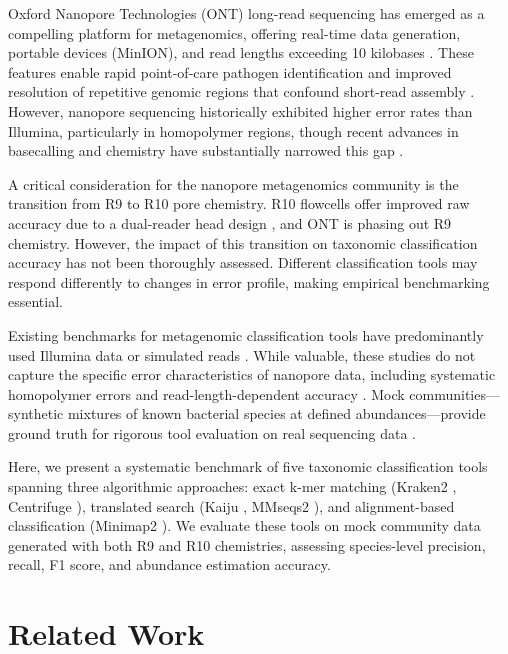 \documentclass[11pt]{article}
\begin{document}
Oxford Nanopore Technologies (ONT) long-read sequencing has emerged as a compelling platform for metagenomics, offering real-time data generation, portable devices (MinION), and read lengths exceeding 10 kilobases \citep{jain2016,loose2019}. These features enable rapid point-of-care pathogen identification and improved resolution of repetitive genomic regions that confound short-read assembly \citep{sanderson2023,samarakoon2020}. However, nanopore sequencing historically exhibited higher error rates than Illumina, particularly in homopolymer regions, though recent advances in basecalling and chemistry have substantially narrowed this gap \citep{wick2019,deschamps2023}.

A critical consideration for the nanopore metagenomics community is the transition from R9 to R10 pore chemistry. R10 flowcells offer improved raw accuracy due to a dual-reader head design \citep{wang2021}, and ONT is phasing out R9 chemistry. However, the impact of this transition on taxonomic classification accuracy has not been thoroughly assessed. Different classification tools may respond differently to changes in error profile, making empirical benchmarking essential.

Existing benchmarks for metagenomic classification tools have predominantly used Illumina data or simulated reads \citep{sczyrba2017,meyer2022,sun2021}. While valuable, these studies do not capture the specific error characteristics of nanopore data, including systematic homopolymer errors and read-length-dependent accuracy \citep{wick2019}. Mock communities---synthetic mixtures of known bacterial species at defined abundances---provide ground truth for rigorous tool evaluation on real sequencing data \citep{bokulich2013,nicholls2019}.

Here, we present a systematic benchmark of five taxonomic classification tools spanning three algorithmic approaches: exact k-mer matching (Kraken2 \citep{wood2019}, Centrifuge \citep{kim2016}), translated search (Kaiju \citep{menzel2016}, MMseqs2 \citep{steinegger2017}), and alignment-based classification (Minimap2 \citep{li2018}). We evaluate these tools on mock community data generated with both R9 and R10 chemistries, assessing species-level precision, recall, F1 score, and abundance estimation accuracy.

\section{Related Work}
\end{document}
